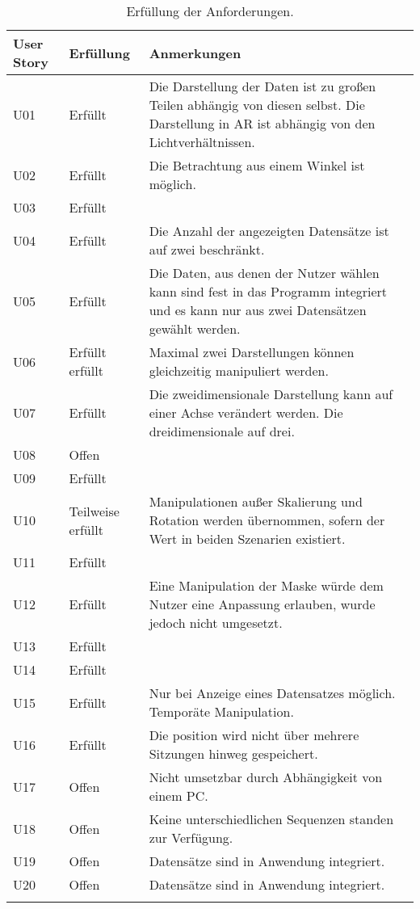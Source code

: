 \begin{longtable} {p{}p{}p{}}
\toprule
User Story & Erfüllung & Anmerkungen \\
\toprule
U01 & Erfüllt & Die Darstellung der Daten ist zu großen Teilen abhängig von diesen selbst. Die Darstellung in AR ist abhängig von den Lichtverhältnissen.\\
\midrule 
U02 & Erfüllt & Die Betrachtung aus einem Winkel ist möglich.\\
\midrule 
U03 & Erfüllt & \\
\midrule 
U04 & Erfüllt & Die Anzahl der angezeigten Datensätze ist auf zwei beschränkt.\\
\midrule 
U05 & Erfüllt & Die Daten, aus denen der Nutzer wählen kann sind fest in das Programm integriert und es kann nur aus zwei Datensätzen gewählt werden.\\
\midrule
U06 & Erfüllt erfüllt & Maximal zwei Darstellungen können gleichzeitig manipuliert werden. \\
\midrule 
U07 & Erfüllt & Die zweidimensionale Darstellung kann auf einer Achse verändert werden. Die dreidimensionale auf drei.\\
\midrule 
U08 & Offen & \\
\midrule 
U09 & Erfüllt & \\
\midrule 
U10 & Teilweise erfüllt & Manipulationen außer Skalierung und Rotation werden übernommen, sofern der Wert in beiden Szenarien existiert.\\
\midrule 
U11  & Erfüllt & \\
\midrule
U12 & Erfüllt & Eine Manipulation der Maske würde dem Nutzer eine Anpassung erlauben, wurde jedoch nicht umgesetzt.\\
\midrule 
U13 & Erfüllt & \\
\midrule 
U14 & Erfüllt & \\
\midrule 
U15 & Erfüllt & Nur bei Anzeige eines Datensatzes möglich. Temporäte Manipulation.\\
\midrule 
U16 & Erfüllt & Die position wird nicht über mehrere Sitzungen hinweg gespeichert.\\
\midrule 
U17 & Offen & Nicht umsetzbar durch Abhängigkeit von einem PC.\\
\midrule 
U18 & Offen & Keine unterschiedlichen Sequenzen standen zur Verfügung.\\
\midrule 
U19 & Offen & Datensätze sind in Anwendung integriert.\\
\midrule 
U20 & Offen & Datensätze sind in Anwendung integriert.\\

\bottomrule
\caption{\label{tab:evaluation}Erfüllung der Anforderungen.}
\end{longtable}

